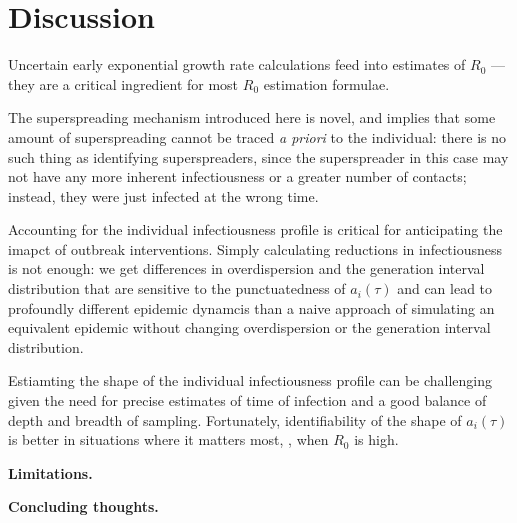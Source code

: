 \clearpage

\section{Discussion}

Uncertain early exponential growth rate calculations feed into estimates of $R_0$ --- they are a critical ingredient for most $R_0$ estimation formulae. 

The superspreading mechanism introduced here is novel, and implies that some amount of superspreading cannot be traced {\it a priori} to the individual: there is no such thing as identifying superspreaders, since the superspreader in this case may not have any more inherent infectiousness or a greater number of contacts; instead, they were just infected at the wrong time. 

Accounting for the individual infectiousness profile is critical for anticipating the imapct of outbreak interventions. Simply calculating reductions in infectiousness is not enough: we get differences in overdispersion and the generation interval distribution that are sensitive to the punctuatedness of $a_i(\tau)$ and can lead to profoundly different epidemic dynamcis than a naive approach of simulating an equivalent epidemic without changing overdispersion or the generation interval distribution. 

Estiamting the shape of the individual infectiousness profile can be challenging given the need for precise estimates of time of infection and a good balance of depth and breadth of sampling. Fortunately, identifiability of the shape of $a_i(\tau)$ is better in situations where it matters most, \ie, when $R_0$ is high. 

{\bf Limitations.}

{\bf Concluding thoughts.}